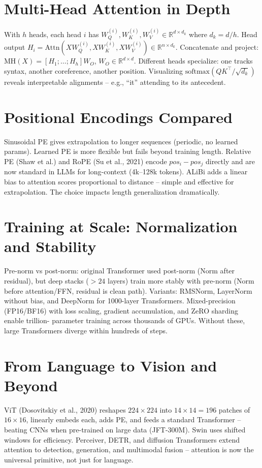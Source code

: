 \section{Multi-Head Attention in Depth}
{\sloppy
With $h$ heads, each head $i$ has $W_Q^{(i)},W_K^{(i)},W_V^{(i)}\in\mathbb{R}^{d\times d_k}$
where $d_k=d/h$. Head output $H_i=\text{Attn}(XW_Q^{(i)},XW_K^{(i)},XW_V^{(i)})\in\mathbb{R}^{n\times d_k}$.
Concatenate and project: $\text{MH}(X)=[H_1;\dots;H_h]W_O$, $W_O\in\mathbb{R}^{d\times d}$.
Different heads specialize: one tracks syntax, another coreference, another
position. Visualizing $\text{softmax}(QK^{\top}/\sqrt{d_k})$ reveals interpretable
alignments -- e.g., ``it'' attending to its antecedent.\par
}

\section{Positional Encodings Compared}
Sinusoidal PE gives extrapolation to longer sequences (periodic, no learned
params). Learned PE is more flexible but fails beyond training length. Relative
PE (Shaw et al.) and RoPE (Su et al., 2021) encode $pos_i-pos_j$ directly and
are now standard in LLMs for long-context (4k--128k tokens). ALiBi adds a linear
bias to attention scores proportional to distance -- simple and effective for
extrapolation. The choice impacts length generalization dramatically.

\section{Training at Scale: Normalization and Stability}
Pre-norm vs post-norm: original Transformer used post-norm (Norm after residual),
but deep stacks ($>24$ layers) train more stably with pre-norm (Norm before
attention/FFN, residual is clean path). Variants: RMSNorm, LayerNorm without
bias, and DeepNorm for 1000-layer Transformers. Mixed-precision (FP16/BF16)
with loss scaling, gradient accumulation, and ZeRO sharding enable trillion-
parameter training across thousands of GPUs. Without these, large Transformers
diverge within hundreds of steps.

\section{From Language to Vision and Beyond}
ViT (Dosovitskiy et al., 2020) reshapes $224\times224$ into $14\times14=196$
patches of $16\times16$, linearly embeds each, adds PE, and feeds a standard
Transformer -- beating CNNs when pre-trained on large data (JFT-300M). Swin
uses shifted windows for efficiency. Perceiver, DETR, and diffusion Transformers
extend attention to detection, generation, and multimodal fusion -- attention is
now the universal primitive, not just for language.

